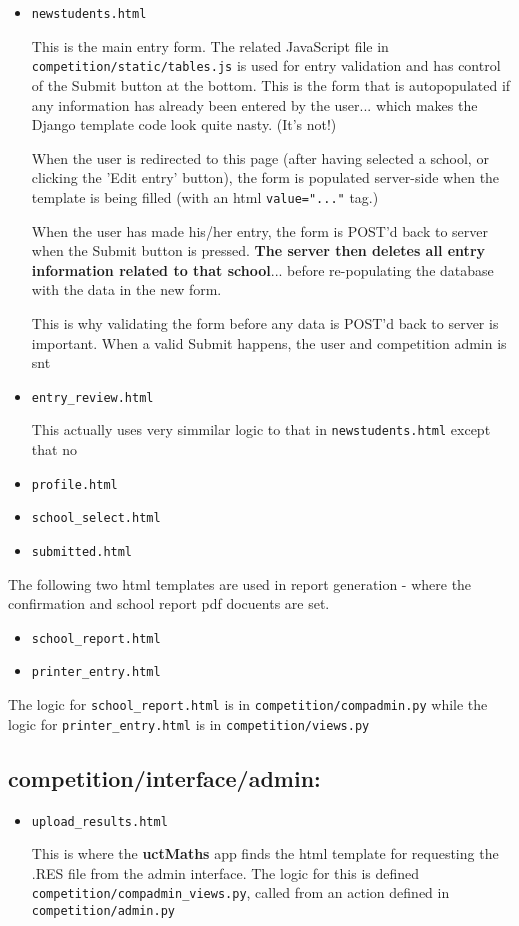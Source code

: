 \documentclass[a4paper,12pt]{article}
\begin{document}
\begin{itemize}
\item \verb|newstudents.html|

This is the main entry form. The related JavaScript file in \verb|competition/static/tables.js| is used for entry validation and has control of the Submit button at the bottom. This is the form that is autopopulated if any information has already been entered by the user... which makes the Django template code look quite nasty. (It's not!)

When the user is redirected to this page (after having selected a school, or clicking the 'Edit entry' button), the form is populated server-side when the template is being filled (with an html \verb|value="..."| tag.)

When the user has made his/her entry, the form is POST'd back to server when the Submit button is pressed. \textbf{The server then deletes all entry information related to that school}... before re-populating the database with the data in the new form.

This is why validating the form before any data is POST'd back to server is important. When a valid Submit happens, the user and competition admin is snt 


\item \verb|entry_review.html|

This actually uses very simmilar logic to that in \verb|newstudents.html| except that no 


\item \verb|profile.html|
\item \verb|school_select.html|
\item \verb|submitted.html|
\end{itemize}

The following two html templates are used in report generation - where the confirmation and school report pdf docuents are set. 

\begin{itemize}
\item \verb|school_report.html| 
\item \verb|printer_entry.html|
\end{itemize}

The logic for \verb|school_report.html| is in \verb|competition/compadmin.py| while the logic for \verb|printer_entry.html| is in \verb|competition/views.py|


\subsection{competition/interface/admin:}

\begin{itemize}
\item \verb|upload_results.html|

This is where the \textbf{uctMaths} app finds the html template for requesting the .RES file from the admin interface. The logic for this is defined \verb|competition/compadmin_views.py|, called from an action defined in \verb|competition/admin.py|

\end{itemize}
\end{document}
